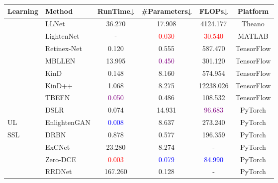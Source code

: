 \documentclass[letterpaper,12pt]{article}
\begin{document}
	\begin{table}[!htbp]
		\centering
		\tiny
			\begin{tabular}{>{\centering\arraybackslash}m{1.5cm}|>{\centering\arraybackslash}m{2.5cm}|c|c|c|c}
				
				\hline %
				
				
				\textbf{Learning} & \textbf{Method} & \textbf{RunTime↓} & \textbf{\#Parameters↓} & \textbf{FLOPs↓} & \textbf{Platform} \\
				
				\hline	
				
				\multirowcell{8}{SL} & LLNet & 36.270 & 17.908 & 4124.177 & Theano   \\
				& LightenNet & - & \textcolor{red}{0.030} & \textcolor{red}{30.540} & MATLAB   \\
				& Retinex-Net& 0.120 & 0.555 & 587.470 & TensorFlow  \\
				& MBLLEN 	 & 13.995 & \textcolor{purple}{0.450} & 301.120 & TensorFlow   \\
				& KinD 		 & 0.148 & 8.160 & 574.954 & TensorFlow   \\
				& KinD++     & 1.068 & 8.275 & 12238.026 & TensorFlow   \\
				& TBEFN 	 & \textcolor{purple}{0.050} &  0.486 & 108.532 & TensorFlow   \\
				& DSLR 		 & 0.074 &14.931 & \textcolor{purple}{96.683} & PyTorch   \\
				
				\hline
				
				UL & EnlightenGAN & \textcolor{blue}{0.008} & 8.637 & 273.240 & PyTorch   \\
				
				\hline
				
				SSL  & DRBN       & 0.878 & 0.577 & 196.359 & PyTorch   \\ 
				
				\hline
				
				\multirowcell{3}{ZSL}& ExCNet& 23.280 & 8.274 & - & PyTorch   \\
				& Zero-DCE& \textcolor{red}{0.003} & \textcolor{blue}{0.079} & \textcolor{blue}{84.990} & PyTorch   \\
				& RRDNet  & 167.260 & 0.128 & - & PyTorch   \\
				

\end{tabular}
\end{table}
\end{document}
